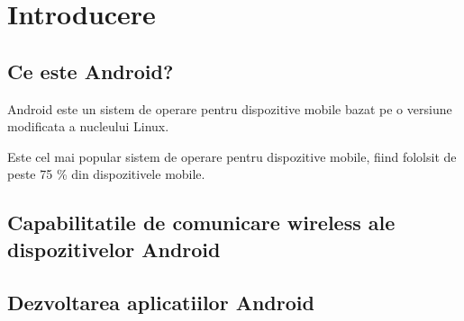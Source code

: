 \section{Introducere}
\subsection{Ce este Android?}

Android este un sistem de operare pentru dispozitive mobile bazat pe o versiune modificata a nucleului Linux.

Este cel mai popular sistem de operare pentru dispozitive mobile, fiind fololsit de peste 75 \% din dispozitivele mobile.

\subsection{Capabilitatile de comunicare wireless ale dispozitivelor Android}
\subsection{Dezvoltarea aplicatiilor Android}